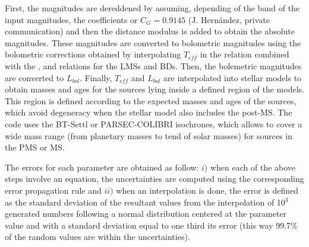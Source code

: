 \documentclass[12pt]{article}
\begin{document}
First, the magnitudes are dereddened by assuming, depending of the band of the input magnitudes, the \citet{Cardelli1989} coefficients or $C_G=0.9145$ (J. Hern\'andez, private communication) and then the distance modulus is added to obtain the absolute magnitudes. These magnitudes are converted to bolometric magnitudes using the bolometric corrections obtained by interpolating $T_{eff}$ in the \citet{Kenyon-Hartmann1995} relation combined with the \citet{Luhman1999}, \citet{Briceno2002} and \citet{Luhman2003b} relations for the LMSs and BDs. Then, the bolemetric magnitudes are converted to $L_{bol}$. Finally, $T_{eff}$ and $L_{bol}$ are interpolated into stellar models to obtain masses and ages for the sources lying inside a defined region of the models. This region is defined according to the expected masses and ages of the sources, which avoid degeneracy when the stellar model also includes the post-MS. The code uses the BT-Settl or PARSEC-COLIBRI isochrones, which allows to cover a wide mass range (from planetary masses to tend of solar masses) for sources in the PMS or MS.

The errors for each parameter are obtained as follow: $i)$ when each of the above steps involve an equation, the uncertainties are computed using the corresponding error propagation rule and $ii)$ when an interpolation is done, the error is defined as the standard deviation of the resultant values from the interpolation of 10$^3$ generated numbers following a normal distribution centered at the parameter value and with a standard deviation equal to one third its error (this way 99.7\% of the random values are within the uncertainties).

\end{document}
